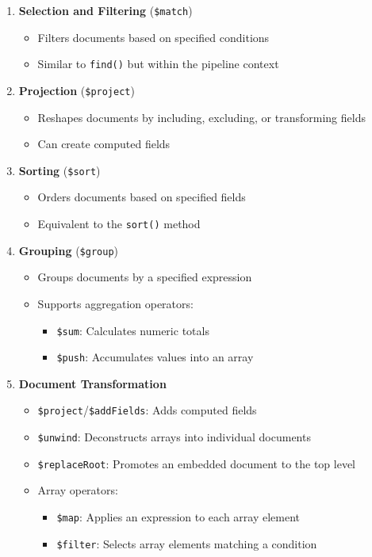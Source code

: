 \begin{enumerate}
  \item \textbf{Selection and Filtering} (\texttt{\$match})
  \begin{itemize}
      \item Filters documents based on specified conditions
      \item Similar to \texttt{find()} but within the pipeline context
  \end{itemize}

  \item \textbf{Projection} (\texttt{\$project})
  \begin{itemize}
      \item Reshapes documents by including, excluding, or transforming fields
      \item Can create computed fields
  \end{itemize}

  \item \textbf{Sorting} (\texttt{\$sort})
  \begin{itemize}
      \item Orders documents based on specified fields
      \item Equivalent to the \texttt{sort()} method
  \end{itemize}

  \item \textbf{Grouping} (\texttt{\$group})
  \begin{itemize}
      \item Groups documents by a specified expression
      \item Supports aggregation operators:
          \begin{itemize}
              \item \texttt{\$sum}: Calculates numeric totals
              \item \texttt{\$push}: Accumulates values into an array
          \end{itemize}
  \end{itemize}

  \item \textbf{Document Transformation}
  \begin{itemize}
      \item \texttt{\$project}/\texttt{\$addFields}: Adds computed fields
      \item \texttt{\$unwind}: Deconstructs arrays into individual documents
      \item \texttt{\$replaceRoot}: Promotes an embedded document to the top level
      \item Array operators:
          \begin{itemize}
              \item \texttt{\$map}: Applies an expression to each array element
              \item \texttt{\$filter}: Selects array elements matching a condition
          \end{itemize}
  \end{itemize}


\end{enumerate}
